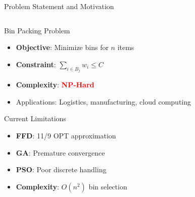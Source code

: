 \documentclass[aspectratio=169,12pt]{beamer}
\begin{document}
\begin{frame}{Problem Statement and Motivation}
\footnotesize %
\setlength{\itemsep}{2.5pt} %
\setlength{\parskip}{0.5pt}

\begin{columns}[T]
\begin{column}{0.5\textwidth}
\begin{block}{Bin Packing Problem}
\begin{itemize}
    \item \textbf{Objective}: Minimize bins for $n$ items
    \item \textbf{Constraint}: $\sum_{i \in B_j} w_i \leq C$
    \item \textbf{Complexity}: \textbf{\textcolor{red}{NP-Hard}}
    \item Applications: Logistics, manufacturing, cloud computing
\end{itemize}
\end{block}

\vspace{-.09cm}
\begin{alertblock}{Current Limitations}
\begin{itemize}
    \item \textbf{FFD}: 11/9 OPT approximation
    \item \textbf{GA}: Premature convergence
    \item \textbf{PSO}: Poor discrete handling
    \item \textbf{Complexity}: $O(n^2)$ bin selection
\end{itemize}
\end{alertblock}
\end{column}

\begin{column}{0.5\textwidth}
\begin{center}
\end{center}


\end{column}
\end{columns}
\end{frame}
\end{document}
